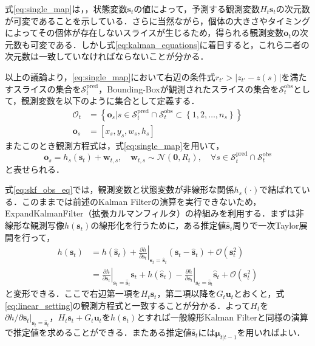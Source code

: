 式\ref{eq:single_map}は，，状態変数$\bm{s}_t$の値によって，予測する観測変数$H_t \bm{s}_t$の次元数が可変であることを示している．さらに当然ながら，個体の大きさやタイミングによってその個体が存在しないスライスが生じるため，得られる観測変数$\bm{o}_t$の次元数も可変である．しかし式\ref{eq:kalman_equations}に着目すると，これら二者の次元数は一致していなければならないことが分かる．
\par
以上の議論より，\ref{eq:single_map}において右辺の条件式$r_{t'} > \left| z_{t'} - z(s) \right|$を満たすスライスの集合を$\mathcal{S}^{\text{pred}}_t$，Bounding-Boxが観測されたスライスの集合を$\mathcal{S}_t^{\text{obs}}$として，観測変数を以下のように集合として定義する．
\begin{equation}
    \label{eq:skf_obs}
    \begin{aligned}
        \mathcal{O}_t &= \left\{\left.\bm{o}_s\right| s \in \mathcal{S}_t^{\text{pred}} \cap \mathcal{S}_t^{\text{obs}} \subset \left\{1,2,\dots,n_s\right\} \right\}
        \\ \bm{o}_s &= \left[x_s, y_s, w_s, h_s\right]
    \end{aligned}    
\end{equation}
またこのとき観測方程式は，式\ref{eq:single_map}を用いて，
\begin{equation}
    \label{eq:skf_obs_eq}
    \bm{o}_s = h_s(\bm{s}_t) + \bm{w}_{t,s}, \quad \bm{w}_{t,s} \sim \mathcal{N}(\bm{0}, R_{t}),\quad \forall s \in \mathcal{S}_t^{\text{pred}} \cap \mathcal{S}_t^{\text{obs}}
\end{equation}
と表せられる．
\par
式\ref{eq:skf_obs_eq}では，観測変数と状態変数が非線形な関係$h_s(\cdot)$で結ばれている．このままでは前述のKalman Filterの演算を実行できないため，ExpandKalmanFilter（拡張カルマンフィルタ）の枠組みを利用する．まずは非線形な観測写像$h(\bm{s}_t)$の線形化を行うために，ある推定値$\hat{\bm{s}}_t$周りで一次Taylor展開を行って，
\begin{equation}
    \begin{aligned}
        h(\bm{s}_t) &= h(\hat{\bm{s}}_t) + \left.\frac{\partial h}{\partial \bm{s}_t}\right|_{\bm{s}_t=\hat{\bm{s}}_t} \left(\bm{s}_t - \hat{\bm{s}}_t\right) + \mathcal{O}(\bm{s}_t^2)
        \\ &= \left.\frac{\partial h}{\partial \bm{s}_t}\right|_{\bm{s}_t=\hat{\bm{s}}_t} \bm{s}_t + h(\hat{\bm{s}}_t) - \left.\frac{\partial h}{\partial \bm{s}_t}\right|_{\bm{s}_t=\hat{\bm{s}}_t} \hat{\bm{s}}_t + \mathcal{O}(\bm{s}_t^2)
    \end{aligned}
\end{equation}
と変形できる．ここで右辺第一項を$H_t \bm{s}_t$，第二項以降を$G_t \bm{u}_t$とおくと，式\ref{eq:linear_setting}の観測方程式と一致することが分かる．よって$H_t$を$\left.\partial h / \partial \bm{s}_t\right|_{\bm{s}_t=\hat{\bm{s}}_t}$，$H_t \bm{s}_t + G_t \bm{u}_t$を$h(\bm{s}_t)$とすれば一般線形Kalman Filterと同様の演算で推定値を求めることができる．またある推定値$\hat{\bm{s}}_t$には$\bm{\mu}_{t|t-1}$を用いればよい．

